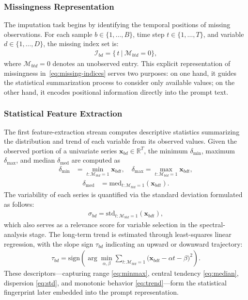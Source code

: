 \documentclass[conference]{IEEEtran}
\begin{document}
\subsubsection{Missingness Representation}
The imputation task begins by identifying the temporal positions of missing observations.
For each sample $b \in \{1, \dots, B\}$, time step $t \in \{1, \dots, T\}$,
and variable $d \in \{1, \dots, D\}$, the missing index set is:
\begin{align}
\mathcal{I}_{bd} = \big\{\, t \ \big|\ \mathcal{M}_{btd} = 0 \big\},
\label{eq:missing-indices}
\end{align}
where $\mathcal{M}_{btd} = 0$ denotes an unobserved entry.
This explicit representation of missingness in~\eqref{eq:missing-indices} serves two purposes:
on one hand, it guides the statistical summarization process to consider only available values;
on the other hand, it encodes positional information directly into the prompt text.

\subsubsection{Statistical Feature Extraction}
\label{subsubsec:stastical-feature-extraction}
The first feature-extraction stream computes descriptive statistics summarizing the distribution and trend of each variable from its observed values.
Given the observed portion of a univariate series $\mathbf{x}_{bd} \in \mathbb{R}^T$, the minimum $\delta_{\min}$, maximum $\delta_{\max}$, and median $\delta_{\mathrm{med}}$ are computed as
\begin{align}
\label{eq:minmax}
\delta_{\min} &= \min_{t:\mathcal{M}_{btd}=1} \mathbf{x}_{bdt}, \quad
\delta_{\max} = \max_{t:\mathcal{M}_{btd}=1} \mathbf{x}_{bdt},
\end{align}
\begin{align}
\label{eq:median}
\delta_{\mathrm{med}} &= \mathrm{med}_{t:\mathcal{M}_{btd}=1}(\mathbf{x}_{bdt}).
\end{align}
The variability of each series is quantified via the standard deviation formulated as follows:
\begin{align}
\sigma_{bd} = \mathrm{std}_{t:\mathcal{M}_{btd}=1}(\mathbf{x}_{bdt}),
\label{eq:std}
\end{align}
which also serves as a relevance score for variable selection in the spectral-analysis stage.
The long-term trend is estimated through least-squares linear regression, with the slope sign $\tau_{bd}$ indicating an upward or downward trajectory:
\begin{align}
\tau_{bd} = \mathrm{sign} \left( \arg\min_{\alpha,\beta} \sum_{t:\mathcal{M}_{btd}=1} \big(\mathbf{x}_{bdt} - \alpha t - \beta\big)^2 \right).
\label{eq:trend}
\end{align}
These descriptors---capturing range \eqref{eq:minmax}, central tendency \eqref{eq:median}, dispersion \eqref{eq:std}, and monotonic behavior \eqref{eq:trend}---form the statistical fingerprint later embedded into the prompt representation.
\end{document}
